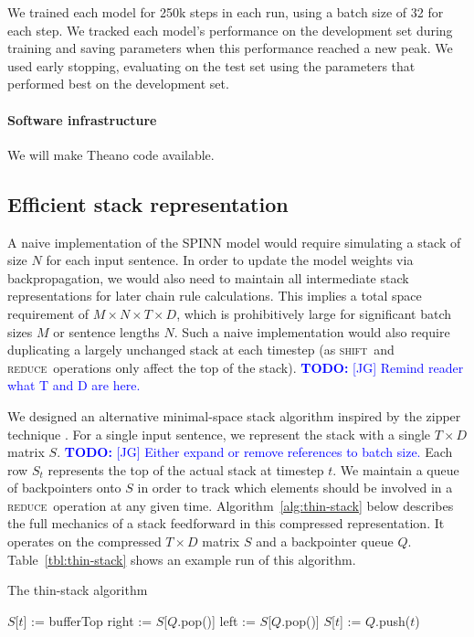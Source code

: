\documentclass[11pt]{article}
\newcommand\todo[1]{\textcolor{blue}{\textbf{TODO:} #1}}
\newcommand{\shift}{\textsc{shift}}
\newcommand{\reduce}{\textsc{reduce}}
\begin{document}
We trained each model for 250k steps in each run, using a batch size of 32 for each step. We tracked each model's performance on the development set during training and saving parameters when this performance reached a new peak. We used early stopping, evaluating on the test set using the parameters that performed best on the development set.

\paragraph{Software infrastructure} We will make Theano code available.

\subsection{Efficient stack representation}

A naive implementation of the SPINN model would require simulating a stack of size $N$ for each input sentence. In order to update the model weights via backpropagation, we would also need to maintain all intermediate stack representations for later chain rule calculations. This implies a total space requirement of $M \times N \times T \times D$, which is prohibitively large for significant batch sizes $M$ or sentence lengths $N$. Such a naive implementation would also require duplicating a largely unchanged stack at each timestep (as \shift~and \reduce~operations only affect the top of the stack). \todo{[JG] Remind reader what T and D are here.}

We designed an alternative minimal-space stack algorithm inspired by the zipper technique \citep{huet1997zipper}. For a single input sentence, we represent the stack with a single $T \times D$ matrix $S$. \todo{[JG] Either expand or remove references to batch size.} Each row $S_t$ represents the top of the actual stack at timestep $t$. We maintain a queue of backpointers onto $S$ in order to track which elements should be involved in a \reduce~operation at any given time. Algorithm~\ref{alg:thin-stack} below describes the full mechanics of a stack feedforward in this compressed representation. It operates on the compressed $T \times D$ matrix $S$ and a backpointer queue $Q$. Table~\ref{tbl:thin-stack} shows an example run of this algorithm.

\begin{algorithm}
\caption{The thin-stack algorithm}
\label{alg:thin-stack}
\begin{algorithmic}[1]
    \If{op = \shift}
      \State $S$[$t$] := bufferTop
    \ElsIf{op = \reduce}
      \State right := $S$[$Q$.pop()]
      \State left := $S$[$Q$.pop()]
      \State $S$[$t$] := 
    \EndIf
    \State $Q$.push($t$)
  \EndFunction
\end{algorithmic}
\end{algorithm}
\end{document}

